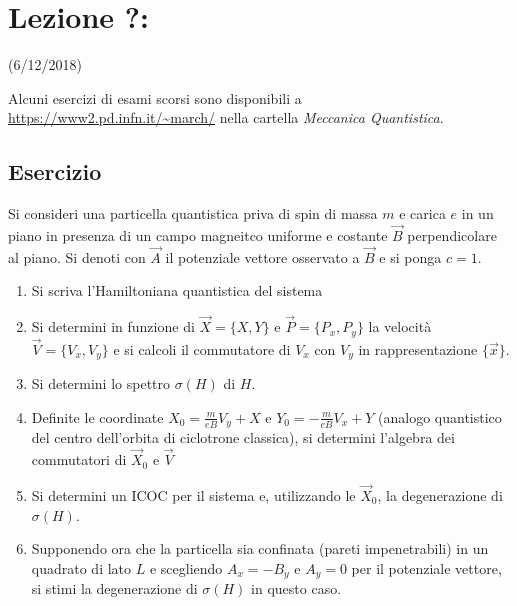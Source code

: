 \documentclass[../../FisicaTeorica.tex]{subfiles}
\begin{document}
\section{Lezione ?:\\ \large{}}
\vspace{-1em}
\begin{center}
    \small{(6/12/2018)}
\end{center}

Alcuni esercizi di esami scorsi sono disponibili a \url{https://www2.pd.infn.it/~march/} nella cartella \textit{Meccanica Quantistica}.

\subsection{Esercizio}
Si consideri una particella quantistica priva di spin di massa $m$ e carica $e$ in un piano in presenza di un campo magneitco uniforme e costante $\vec{B}$ perpendicolare al piano. Si denoti con $\vec{A}$ il potenziale vettore osservato a $\vec{B}$ e si ponga $c=1$.
\begin{enumerate}
\item Si scriva l'Hamiltoniana quantistica del sistema
\item Si determini in funzione di $\vec{X}=\{X,Y\}$ e $\vec{P}= \{P_x, P_y\}$ la velocità $\vec{V}=\{V_x, V_y\}$ e si calcoli il commutatore di $V_x$ con $V_y$ in rappresentazione $\{\vec{x}\}$.
\item Si determini lo spettro $\sigma(H)$ di $H$.
\item Definite le coordinate $X_0=\frac{m}{eB}V_y + X$ e $Y_0 = -\frac{m}{eB}V_x + Y$ (analogo quantistico del centro dell'orbita di ciclotrone classica), si determini l'algebra dei commutatori di $\vec{X}_0$ e $\vec{V}$
\item Si determini un ICOC per il sistema e, utilizzando le $\vec{X}_0$, la degenerazione di $\sigma(H)$.
\item Supponendo ora che la particella sia confinata (pareti impenetrabili) in un quadrato di lato $L$ e scegliendo
$A_x = -B_y$ e $A_y=0$ per il potenziale vettore, si stimi la degenerazione di $\sigma(H)$ in questo caso.
\end{enumerate}
\end{document}
